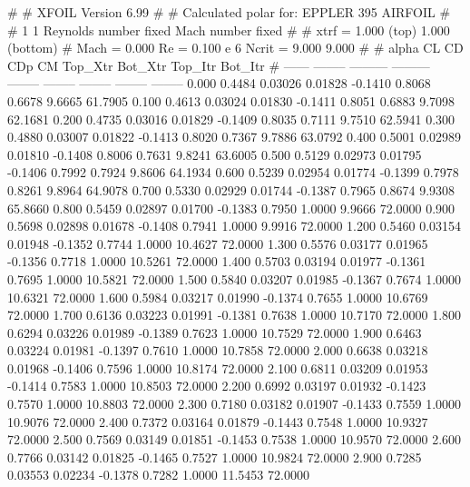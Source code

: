 #  
#       XFOIL         Version 6.99
#  
# Calculated polar for: EPPLER 395 AIRFOIL                              
#  
# 1 1 Reynolds number fixed          Mach number fixed         
#  
# xtrf =   1.000 (top)        1.000 (bottom)  
# Mach =   0.000     Re =     0.100 e 6     Ncrit =   9.000  9.000
#  
#   alpha    CL        CD       CDp       CM     Top_Xtr  Bot_Xtr  Top_Itr  Bot_Itr
#  ------ -------- --------- --------- -------- -------- -------- -------- --------
   0.000   0.4484   0.03026   0.01828  -0.1410   0.8068   0.6678   9.6665  61.7905
   0.100   0.4613   0.03024   0.01830  -0.1411   0.8051   0.6883   9.7098  62.1681
   0.200   0.4735   0.03016   0.01829  -0.1409   0.8035   0.7111   9.7510  62.5941
   0.300   0.4880   0.03007   0.01822  -0.1413   0.8020   0.7367   9.7886  63.0792
   0.400   0.5001   0.02989   0.01810  -0.1408   0.8006   0.7631   9.8241  63.6005
   0.500   0.5129   0.02973   0.01795  -0.1406   0.7992   0.7924   9.8606  64.1934
   0.600   0.5239   0.02954   0.01774  -0.1399   0.7978   0.8261   9.8964  64.9078
   0.700   0.5330   0.02929   0.01744  -0.1387   0.7965   0.8674   9.9308  65.8660
   0.800   0.5459   0.02897   0.01700  -0.1383   0.7950   1.0000   9.9666  72.0000
   0.900   0.5698   0.02898   0.01678  -0.1408   0.7941   1.0000   9.9916  72.0000
   1.200   0.5460   0.03154   0.01948  -0.1352   0.7744   1.0000  10.4627  72.0000
   1.300   0.5576   0.03177   0.01965  -0.1356   0.7718   1.0000  10.5261  72.0000
   1.400   0.5703   0.03194   0.01977  -0.1361   0.7695   1.0000  10.5821  72.0000
   1.500   0.5840   0.03207   0.01985  -0.1367   0.7674   1.0000  10.6321  72.0000
   1.600   0.5984   0.03217   0.01990  -0.1374   0.7655   1.0000  10.6769  72.0000
   1.700   0.6136   0.03223   0.01991  -0.1381   0.7638   1.0000  10.7170  72.0000
   1.800   0.6294   0.03226   0.01989  -0.1389   0.7623   1.0000  10.7529  72.0000
   1.900   0.6463   0.03224   0.01981  -0.1397   0.7610   1.0000  10.7858  72.0000
   2.000   0.6638   0.03218   0.01968  -0.1406   0.7596   1.0000  10.8174  72.0000
   2.100   0.6811   0.03209   0.01953  -0.1414   0.7583   1.0000  10.8503  72.0000
   2.200   0.6992   0.03197   0.01932  -0.1423   0.7570   1.0000  10.8803  72.0000
   2.300   0.7180   0.03182   0.01907  -0.1433   0.7559   1.0000  10.9076  72.0000
   2.400   0.7372   0.03164   0.01879  -0.1443   0.7548   1.0000  10.9327  72.0000
   2.500   0.7569   0.03149   0.01851  -0.1453   0.7538   1.0000  10.9570  72.0000
   2.600   0.7766   0.03142   0.01825  -0.1465   0.7527   1.0000  10.9824  72.0000
   2.900   0.7285   0.03553   0.02234  -0.1378   0.7282   1.0000  11.5453  72.0000
